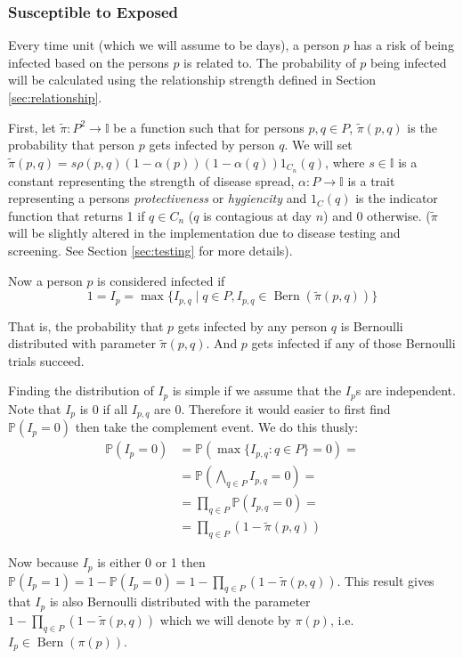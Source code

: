 \documentclass{article}
\newcommand*{\uniti}{\mathbb{I}}
\DeclareMathOperator{\Bern}{Bern}
\begin{document}
\subsubsection{Susceptible to Exposed}
Every time unit (which we will assume to be days), a person \(p\) has a risk of being infected based on the persons \(p\) is related to. The probability of \(p\) being infected will be calculated using the relationship strength defined in Section \ref{sec:relationship}. 

First, let \(\tilde{\pi} : P^2 \rightarrow \uniti\) be a function such that for persons \(p, q \in P\), \(\tilde{\pi}(p, q)\) is the probability that person \(p\) gets infected by person \(q\). We will set \(\tilde{\pi}(p, q) = s\rho(p, q)(1-\alpha(p))(1-\alpha(q))1_{C_n}(q)\), where \(s \in \uniti\) is a constant representing the strength of disease spread, \(\alpha : P \rightarrow \uniti\) is a trait representing a persons \emph{protectiveness} or \emph{hygiencity} and \(1_C(q)\) is the indicator function that returns 1 if \(q \in C_n\) (\(q\) is contagious at day \(n\)) and 0 otherwise. (\(\tilde{\pi}\) will be slightly altered in the implementation due to disease testing and screening. See Section \ref{sec:testing} for more details).

Now a person \(p\) is considered infected if
\[
    1 = I_p = \max\{I_{p,q} \mid q \in P, I_{p, q} \in \Bern(\tilde{\pi}(p, q))\}   
\]

That is, the probability that \(p\) gets infected by any person \(q\) is Bernoulli distributed with parameter \(\tilde{\pi}(p, q)\). And \(p\) gets infected if any of those Bernoulli trials succeed.

Finding the distribution of \(I_p\) is simple if we assume that the \(I_p\)s are independent. Note that \(I_p\) is 0 if all \(I_{p,q}\) are 0. Therefore it would easier to first find \(\mathbb{P}(I_p = 0)\) then take the complement event. We do this thusly:
\begin{align*}
    \mathbb{P}(I_p = 0) &= \mathbb{P}(\max\{I_{p,q} : q \in P\} = 0) = \\
    &= \mathbb{P}\left(\bigwedge_{q \in P} I_{p,q} = 0\right) =\\
    &= \prod_{q \in P} \mathbb{P}(I_{p,q} = 0) = \\
    &= \prod_{q \in P} (1-\tilde{\pi}(p, q))
\end{align*}

Now because \(I_p\) is either 0 or 1 then \(\mathbb{P}(I_p = 1) = 1-\mathbb{P}(I_p = 0) = 1 - \prod_{q \in P} (1-\tilde{\pi}(p, q))\). This result gives that \(I_p\) is also Bernoulli distributed with the parameter \(1 - \prod_{q \in P} (1-\tilde{\pi}(p, q))\) which we will denote by \(\pi(p)\), i.e. \(I_p \in \Bern(\pi(p))\).
\end{document}
